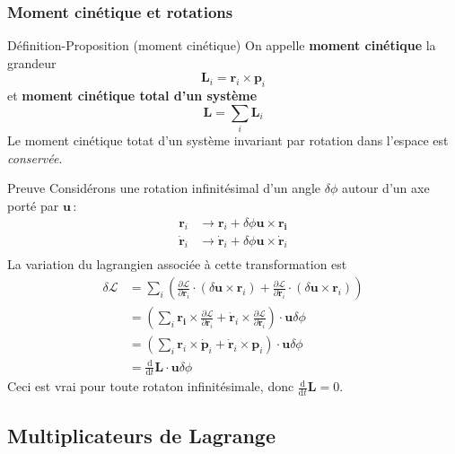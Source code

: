         \subsubsection{Moment cinétique et rotations}

        \begin{omed}{Définition-Proposition (moment cinétique)}
            On appelle \textbf{moment cinétique} la grandeur 
            \[ \mathbf{L}_i = \mathbf{r}_i \times \mathbf{p}_i \]   
            et \textbf{moment cinétique total d’un système} 
            \[ \mathbf{L} = \sum_{i} \mathbf{L}_i \]   
            Le moment cinétique totat d’un système invariant par rotation dans l’espace est \textit{conservée}.
        \end{omed}

        \begin{demo}{Preuve}
            Considérons une rotation infinitésimal d’un angle $\delta \phi$ autour d’un axe porté par $\mathbf{u}$ :
            \begin{align*}
                \mathbf{r}_i &\to \mathbf{r}_i + \delta \phi \mathbf{u} \times \mathbf{r_i} \\
                \dot{\mathbf{r}}_i &\to \dot{\mathbf{r}}_i + \delta \phi \mathbf{u} \times \dot{\mathbf{r}}_i \\
            \end{align*}
            La variation du lagrangien associée à cette transformation est 
            \begin{align*}
                \delta \mathcal{L} 
                &= \sum_{i} \left(\frac{\partial \mathcal{L}}{\partial \mathbf{r}_i} \cdot (\delta \mathbf{u} \times \mathbf{r}_i) + \frac{\partial \mathcal{L}}{\partial \dot{\mathbf{r}}_i} \cdot (\delta \mathbf{u} \times \mathbf{r}_i)\right) \\
                &= \left(\sum_i \mathbf{r_i} \times \frac{\partial \mathcal{L}}{\partial \mathbf{r}_i} + \dot{\mathbf{r}}_i \times \frac{\partial \mathcal{L}}{\partial \dot{\mathbf{r}}_i} \right) \cdot \mathbf{u} \delta \phi \\
                &= \left(\sum_i \mathbf{r}_i \times \dot{\mathbf{p}}_i + \dot{\mathbf{r}}_i \times \mathbf{p}_i\right) \cdot \mathbf{u} \delta \phi \\ 
                &= \frac{\text{d}}{\text{d}t} \mathbf{L} \cdot \mathbf{u} \delta \phi 
            \end{align*}
            Ceci est vrai pour toute rotaton infinitésimale, donc $\frac{\text{d}}{\text{d}t} \mathbf{L} = 0$.
        \end{demo}

    \subsection{Multiplicateurs de Lagrange}

    









    